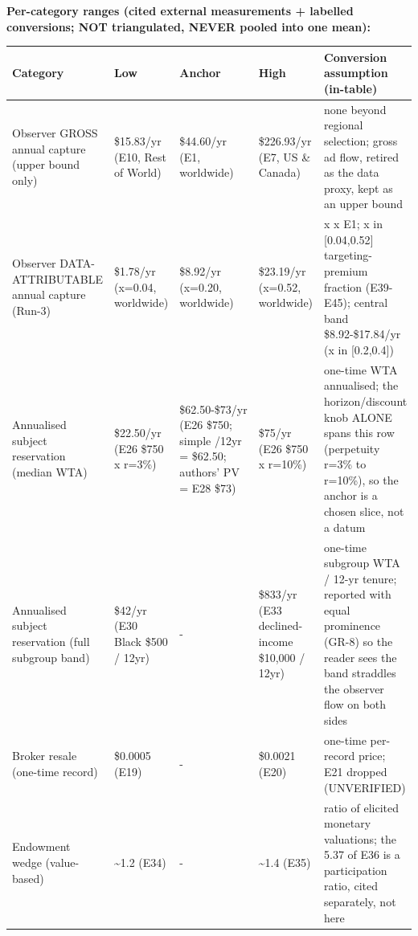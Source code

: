 \documentclass[
  11pt,
]{article}
\newcounter{none} %
\begin{document}
\textbf{Per-category ranges (cited external measurements + labelled
conversions; NOT triangulated, NEVER pooled into one mean):}

{\def\LTcaptype{none} %
\begin{longtable}[]{@{}
  >{\raggedright\arraybackslash}p{}
  >{\raggedright\arraybackslash}p{}
  >{\raggedright\arraybackslash}p{}
  >{\raggedright\arraybackslash}p{}
  >{\raggedright\arraybackslash}p{}@{}}
\toprule\noalign{}
\begin{minipage}[b]{\linewidth}\raggedright
Category
\end{minipage} & \begin{minipage}[b]{\linewidth}\raggedright
Low
\end{minipage} & \begin{minipage}[b]{\linewidth}\raggedright
Anchor
\end{minipage} & \begin{minipage}[b]{\linewidth}\raggedright
High
\end{minipage} & \begin{minipage}[b]{\linewidth}\raggedright
Conversion assumption (in-table)
\end{minipage} \\
\midrule\noalign{}
\endhead
\bottomrule\noalign{}
\endlastfoot
Observer GROSS annual capture (upper bound only) & \$15.83/yr (E10, Rest
of World) & \$44.60/yr (E1, worldwide) & \$226.93/yr (E7, US \& Canada)
& none beyond regional selection; gross ad flow, retired as the data
proxy, kept as an upper bound \\
Observer DATA-ATTRIBUTABLE annual capture (Run-3) & \$1.78/yr (x=0.04,
worldwide) & \$8.92/yr (x=0.20, worldwide) & \$23.19/yr (x=0.52,
worldwide) & x x E1; x in {[}0.04,0.52{]} targeting-premium fraction
(E39-E45); central band \$8.92-\$17.84/yr (x in {[}0.2,0.4{]}) \\
Annualised subject reservation (median WTA) & \$22.50/yr (E26 \$750 x
r=3\%) & \$62.50-\$73/yr (E26 \$750; simple /12yr = \$62.50; authors' PV
= E28 \$73) & \$75/yr (E26 \$750 x r=10\%) & one-time WTA annualised;
the horizon/discount knob ALONE spans this row (perpetuity r=3\% to
r=10\%), so the anchor is a chosen slice, not a datum \\
Annualised subject reservation (full subgroup band) & \$42/yr (E30 Black
\$500 / 12yr) & - & \$833/yr (E33 declined-income \$10,000 / 12yr) &
one-time subgroup WTA / 12-yr tenure; reported with equal prominence
(GR-8) so the reader sees the band straddles the observer flow on both
sides \\
Broker resale (one-time record) & \$0.0005 (E19) & - & \$0.0021 (E20) &
one-time per-record price; E21 dropped (UNVERIFIED) \\
Endowment wedge (value-based) & \textasciitilde1.2 (E34) & - &
\textasciitilde1.4 (E35) & ratio of elicited monetary valuations; the
5.37 of E36 is a participation ratio, cited separately, not here \\
\end{longtable}
}
\end{document}
